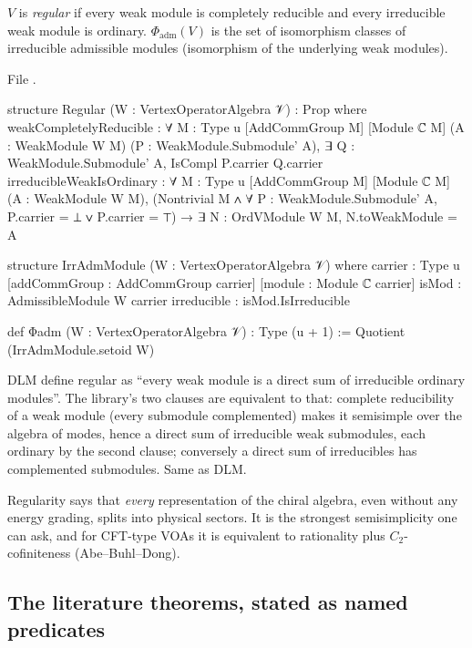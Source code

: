 \begin{definition}\label{l12:def:regular}
$V$ is \emph{regular} if every weak module is completely reducible and every irreducible weak module is ordinary.
$\Phi_{\mathrm{adm}}(V)$ is the set of isomorphism classes of irreducible admissible modules (isomorphism of the underlying
weak modules).
\end{definition}
\noindent File .
\begin{leancode}
structure Regular (W : VertexOperatorAlgebra 𝒱) : Prop where
  weakCompletelyReducible : ∀ {M : Type u} [AddCommGroup M] [Module ℂ M] (A : WeakModule W M)
    (P : WeakModule.Submodule' A), ∃ Q : WeakModule.Submodule' A, IsCompl P.carrier Q.carrier
  irreducibleWeakIsOrdinary : ∀ {M : Type u} [AddCommGroup M] [Module ℂ M] (A : WeakModule W M),
    (Nontrivial M ∧ ∀ P : WeakModule.Submodule' A, P.carrier = ⊥ ∨ P.carrier = ⊤) →
    ∃ N : OrdVModule W M, N.toWeakModule = A

structure IrrAdmModule (W : VertexOperatorAlgebra 𝒱) where
  carrier : Type u
  [addCommGroup : AddCommGroup carrier]
  [module : Module ℂ carrier]
  isMod : AdmissibleModule W carrier
  irreducible : isMod.IsIrreducible

def Φadm (W : VertexOperatorAlgebra 𝒱) : Type (u + 1) := Quotient (IrrAdmModule.setoid W)
\end{leancode}

\begin{dictionary}
DLM define regular as ``every weak module is a direct sum of irreducible ordinary modules''. The library's two clauses are
equivalent to that: complete reducibility of a weak module (every submodule complemented) makes it semisimple over the
algebra of modes, hence a direct sum of irreducible weak submodules, each ordinary by the second clause; conversely a
direct sum of irreducibles has complemented submodules. Same as DLM.
\end{dictionary}

\begin{physics}
Regularity says that \emph{every} representation of the chiral algebra, even without any energy grading, splits into
physical sectors. It is the strongest semisimplicity one can ask, and for CFT-type VOAs it is equivalent to rationality
plus $C_2$-cofiniteness (Abe--Buhl--Dong).
\end{physics}

\subsection{The literature theorems, stated as named predicates}\label{l12:sec:litnamed}

